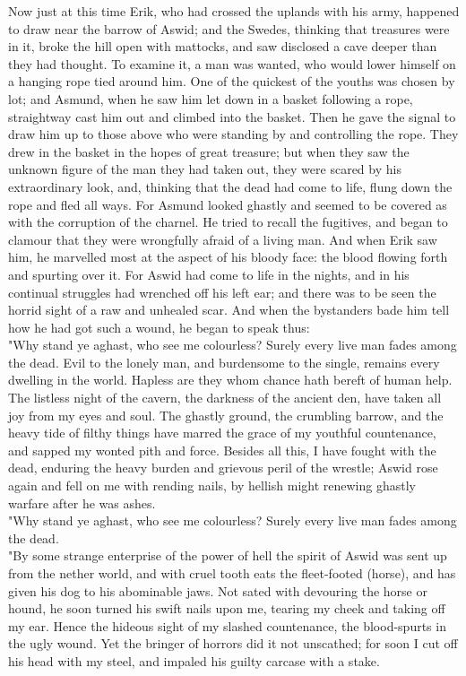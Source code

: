 \documentclass[10pt,a4paper]{report}
\begin{document}
Now just at this time Erik, who had crossed the uplands with his army, happened to draw near the barrow of Aswid; and the Swedes, thinking that treasures were in it, broke the hill open with mattocks, and saw disclosed a cave deeper than they had thought. To examine it, a man was wanted, who would lower himself on a hanging rope tied around him. One of the quickest of the youths was chosen by lot; and Asmund, when he saw him let down in a basket following a rope, straightway cast him out and climbed into the basket. Then he gave the signal to draw him up to those above who were standing by and controlling the rope. They drew in the basket in the hopes of great treasure; but when they saw the unknown figure of the man they had taken out, they were scared by his extraordinary look, and, thinking that the dead had come to life, flung down the rope and fled all ways. For Asmund looked ghastly and seemed to be covered as with the corruption of the charnel. He tried to recall the fugitives, and began to clamour that they were wrongfully afraid of a living man. And when Erik saw him, he marvelled most at the aspect of his bloody face: the blood flowing forth and spurting over it. For Aswid had come to life in the nights, and in his continual struggles had wrenched off his left ear; and there was to be seen the horrid sight of a raw and unhealed scar. And when the bystanders bade him tell how he had got such a wound, he began to speak thus:\\

"Why stand ye aghast, who see me colourless? Surely every live man fades among the dead. Evil to the lonely man, and burdensome to the single, remains every dwelling in the world. Hapless are they whom chance hath bereft of human help. The listless night of the cavern, the darkness of the ancient den, have taken all joy from my eyes and soul. The ghastly ground, the crumbling barrow, and the heavy tide of filthy things have marred the grace of my youthful countenance, and sapped my wonted pith and force. Besides all this, I have fought with the dead, enduring the heavy burden and grievous peril of the wrestle; Aswid rose again and fell on me with rending nails, by hellish might renewing ghastly warfare after he was ashes.\\

"Why stand ye aghast, who see me colourless? Surely every live man fades among the dead.\\

"By some strange enterprise of the power of hell the spirit of Aswid was sent up from the nether world, and with cruel tooth eats the fleet-footed (horse), and has given his dog to his abominable jaws. Not sated with devouring the horse or hound, he soon turned his swift nails upon me, tearing my cheek and taking off my ear. Hence the hideous sight of my slashed countenance, the blood-spurts in the ugly wound. Yet the bringer of horrors did it not unscathed; for soon I cut off his head with my steel, and impaled his guilty carcase with a stake.\\
\end{document}

